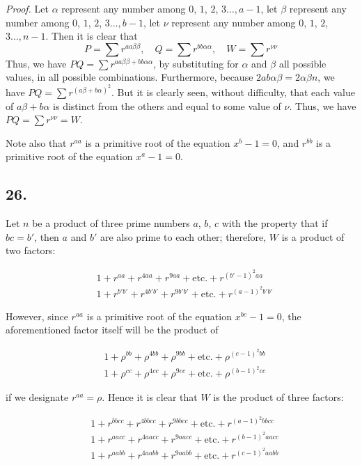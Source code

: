 \documentclass[twoside,12pt, showframe]{memoir}
\begin{document}
\textit{Proof.} Let \(\alpha\) represent any number among \(0\), \(1\), \(2\), \(3\ldots, a-1\), let \(\beta\) represent any number among \(0\), \(1\), \(2\), \(3\ldots, b-1\), let \(\nu\) represent any number among \(0\), \(1\), \(2\), \(3\ldots, n-1\). Then it is clear that
\[P=\sum r^{a a \beta \beta}, \quad Q=\sum r^{b b \alpha \alpha}, \quad W=\sum r^{\nu \nu}\]
Thus, we have \(PQ=\sum r^{a a \beta \beta +b b \alpha \alpha}\), by substituting for \(\alpha\) and \(\beta\) all possible values, in all possible combinations. Furthermore, because \(2ab\alpha\beta=2\alpha\beta n\), we have \(PQ=\sum r^{(a \beta+b \alpha)^{2}}\). But it is clearly seen, without difficulty, that each value of \(a \beta+b \alpha\) is distinct from the others and equal to some value of \(\nu\). Thus, we have \(PQ=\sum r^{\nu \nu}=W\).

Note also that \(r^{a a}\) is a primitive root of the equation \(x^{b}-1=0\), and \(r^{b b}\) is a primitive root of the equation \(x^{a}-1=0\).\clearpage\noindent%
%

\subsection*{26.}

Let \(n\) be a product of three prime numbers \(a\), \(b\), \(c\) with the property that if \(bc = b'\), then \(a\) and \(b'\) are also prime to each other; therefore, \(W\) is a product of two factors:

\[
\begin{aligned}
& 1+r^{aa}+r^{4aa}+r^{9aa}+\text{etc.}+r^{(b'-1)^2aa} \\
& 1+r^{b'b'}+r^{4b'b'}+r^{9b'b'}+\text{etc.}+r^{(a-1)^2b'b'}
\end{aligned}
\]

However, since \(r^{aa}\) is a primitive root of the equation \(x^{bc} - 1 = 0\), the aforementioned factor itself will be the product of

\[
\begin{aligned}
& 1+\rho^{bb}+\rho^{4bb}+\rho^{9bb}+\text{etc.}+\rho^{(c-1)^2bb} \\
& 1+\rho^{cc}+\rho^{4cc}+\rho^{9cc}+\text{etc.}+\rho^{(b-1)^2cc}
\end{aligned}
\]

if we designate \(r^{aa} = \rho\). Hence it is clear that \(W\) is the product of three factors:

\[
\begin{aligned}
& 1+r^{bbcc}+r^{4bbcc}+r^{9bbcc}+\text{etc.}+r^{(a-1)^2bbcc} \\
& 1+r^{aacc}+r^{4aacc}+r^{9aacc}+\text{etc.}+r^{(b-1)^2aacc} \\
& 1+r^{aabb}+r^{4aabb}+r^{9aabb}+\text{etc.}+r^{(c-1)^2aabb}
\end{aligned}
\]
\end{document}
